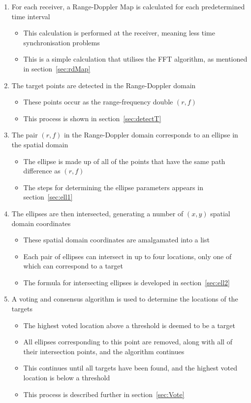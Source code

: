 \documentclass[12pt,openany,a4paper]{book}
\begin{document}
\begin{enumerate}
	\item{For each receiver, a Range-Doppler Map is calculated for each predetermined time interval}
	\begin{itemize}
		\item{This calculation is performed at the receiver, meaning less time synchronisation problems}
		\item{This is a simple calculation that utilises the FFT algorithm, as mentioned in section~\ref{sec:rdMap}}
	\end{itemize}
	\item{The target points are detected in the Range-Doppler domain}
		\begin{itemize}
		\item{These points occur as the range-frequency double $(r,f)$}
		\item{This process is shown in section~\ref{sec:detectT}}
	\end{itemize}
	\item{The pair $(r,f)$ in the Range-Doppler domain corresponds to an ellipse in the spatial domain}
	\begin{itemize}
		\item{The ellipse is made up of all of the points that have the same path difference as $(r,f)$}
		\item{The steps for determining the ellipse parameters appears in section~\ref{sec:ell1}}
	\end{itemize}
	\item{The ellipses are then intersected, generating a number of $(x,y)$ spatial domain coordinates}
	\begin{itemize}
		\item{These spatial domain coordinates are amalgamated into a list}
		\item{Each pair of ellipses can intersect in up to four locations, only one of which can correspond to a target}
		\item{The formula for intersecting ellipses is developed in section~\ref{sec:ell2}}
	\end{itemize}
	\item{A voting and consensus algorithm is used to determine the locations of the targets}
	\begin{itemize}
		\item{The highest voted location above a threshold is deemed to be a target}
		\item{All ellipses corresponding to this point are removed, along with all of their intersection points, and the algorithm continues}
		\item{This continues until all targets have been found, and the highest voted location is below a threshold}
		\item{This process is described further in section~\ref{sec:Vote}}
	\end{itemize}
\end{enumerate}
\end{document}
